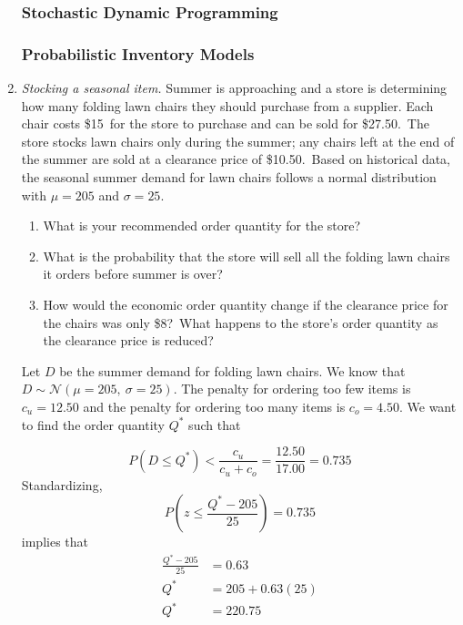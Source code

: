 \begin{enumerate}
\subsubsection*{Stochastic Dynamic Programming}

\subsubsection*{Probabilistic Inventory Models}


\item \emph{Stocking a seasonal item.} Summer is approaching and a
  store is determining how many folding lawn chairs they should
  purchase from a supplier.  Each chair costs \$15\ for the store to
  purchase and can be sold for \$27.50.\ The store stocks lawn chairs
  only during the summer; any chairs left at the end of the summer are
  sold at a clearance price of \$10.50.\ Based on historical data, the
  seasonal summer demand for lawn chairs follows a normal distribution with
  $\mu = 205$ and $\sigma = 25$.

\begin{enumerate}
\item What is your recommended order quantity for the store?
\item What is the probability that the store will sell all the folding
  lawn chairs it orders before summer is over? \label{ex:lawn}
\item How would the economic order quantity change if the clearance
  price for the chairs was only \$8?\ What happens to the store's
  order quantity as the clearance price is reduced? \label{ex:clearance}
\end{enumerate}

\begin{solution}
  \bs Let $D$ be the summer demand for folding lawn chairs. We know
  that $D \sim \mathcal{N}\left(\mu=205,~\sigma=25\right)$. The
  penalty for ordering too few items is $c_u= 12.50$ and the penalty
  for ordering too many items is $c_o= 4.50$. We want to find the
  order quantity $Q^{\ast}$ such that


\[ P\left(D \leq Q^{\ast}\right) < \frac{c_u}{c_u+c_o} = \frac{12.50}{17.00} = 0.735 \]
Standardizing,
\[ P\left(z \leq \frac{Q^{\ast}-205}{25}\right) = 0.735 \]
implies that
\begin{align*}
\frac{Q^{\ast}-205}{25} &= 0.63 \\
Q^{\ast} &= 205 + 0.63(25)\\
Q^{\ast} &= 220.75
\end{align*}


\end{solution}
\end{enumerate}
